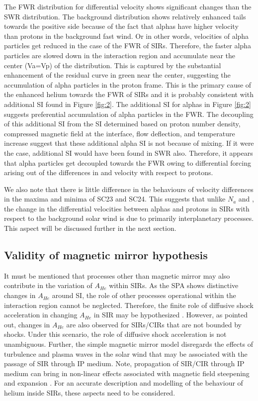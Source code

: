 \documentclass[letters,usenatbib]{mnras}
\begin{document}
The FWR distribution for differential velocity shows significant changes than the SWR distribution. The background distribution shows relatively enhanced tails towards the positive side because of the fact that alphas have higher velocity than protons in the background fast wind. Or in other words, velocities of alpha particles get reduced in the case of the FWR of SIRs. Therefore, the faster alpha particles are slowed down in the interaction region and accumulate near the center (Va=Vp) of the distribution. This is captured by the substantial enhancement of the residual curve in green near the center, suggesting the accumulation of alpha particles in the proton frame. This is the primary cause of the enhanced helium towards the FWR of SIRs  and it is probably consistent with additional SI found in Figure \ref{fig:2}. The additional SI for alphas in Figure \ref{fig:2} suggests preferential accumulation of alpha particles in the FWR. The decoupling of this additional SI from the SI determined based on proton number density, compressed magnetic field at the interface, flow deflection, and temperature increase \citep{Chi2018} suggest that these additional alpha SI is not because of mixing. If it were the case, additional SI would have been found in SWR also. Therefore, it appears that alpha particles get decoupled towards the FWR owing to differential forcing arising out of the differences in  and velocity with respect to protons. 

We also note that there is little difference in the behaviours of velocity differences in the maxima and minima of SC23 and SC24. This suggests that unlike $N_{a}$ and , the change in the differential velocities between alphas and protons in SIRs with respect to the background solar wind is due to primarily interplanetary processes. This aspect will be discussed further in the next section.   

\subsection{Validity of magnetic mirror hypothesis }

It must be mentioned that processes other than magnetic mirror may also contribute in the variation of $A_{He}$ within SIRs. As the SPA shows distinctive changes in $A_{He}$ around SI, the role of other processes operational within the interaction region cannot be neglected. Therefore, the finite role of diffusive shock acceleration in changing $A_{He}$ in SIR may be hypothesized \citep{Durovcova2019}. However, as \cite{Durovcova2019} pointed out, changes in $A_{He}$ are also observed for SIRs/CIRs that are not bounded by shocks. Under this scenario, the role of diffusive shock acceleration is not unambiguous. Further, the simple magnetic mirror model disregards the effects of turbulence and plasma waves in the solar wind that may be associated with the passage of SIR through IP medium. Note, propagation of SIR/CIR through IP medium can bring in non-linear effects associated with magnetic field steepening and expansion \citep[e.g.][]{Burlaga2004,Durovcova2019}. For an accurate description and modelling of the behaviour of helium inside SIRs, these aspects need to be considered. 
\end{document}
